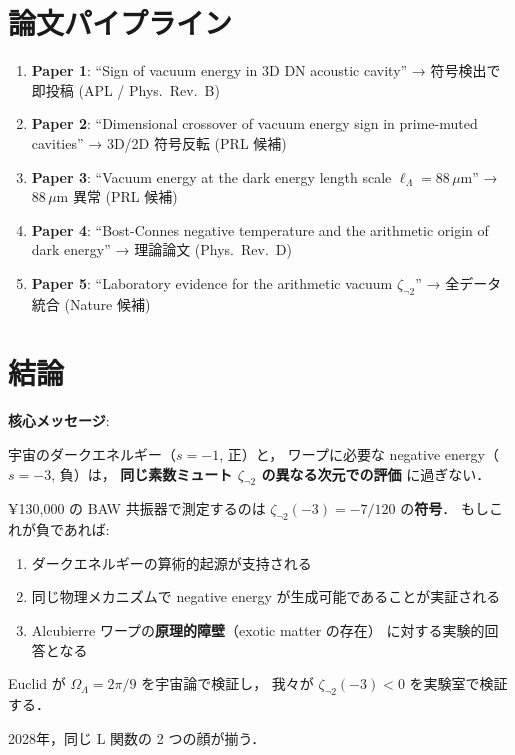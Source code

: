 \documentclass[11pt,a4paper]{article}
\begin{document}
\section{論文パイプライン}

\begin{enumerate}
\item \textbf{Paper 1}: ``Sign of vacuum energy in 3D DN acoustic cavity''
  → 符号検出で即投稿 (APL / Phys.\ Rev.\ B)

\item \textbf{Paper 2}: ``Dimensional crossover of vacuum energy sign
  in prime-muted cavities''
  → 3D/2D 符号反転 (PRL 候補)

\item \textbf{Paper 3}: ``Vacuum energy at the dark energy length scale
  $\ell_\Lambda = 88\,\mu$m''
  → 88\,$\mu$m 異常 (PRL 候補)

\item \textbf{Paper 4}: ``Bost-Connes negative temperature and the
  arithmetic origin of dark energy''
  → 理論論文 (Phys.\ Rev.\ D)

\item \textbf{Paper 5}: ``Laboratory evidence for the arithmetic vacuum
  $\zeta_{\neg 2}$''
  → 全データ統合 (Nature 候補)
\end{enumerate}


\section{結論}

\begin{tcolorbox}[colback=green!5,colframe=green!60!black]
\textbf{核心メッセージ}:

宇宙のダークエネルギー（$s=-1$, 正）と，
ワープに必要な negative energy（$s=-3$, 負）は，
\textbf{同じ素数ミュート $\zeta_{\neg 2}$ の異なる次元での評価}
に過ぎない．

¥130,000 の BAW 共振器で測定するのは $\zeta_{\neg 2}(-3) = -7/120$
の\textbf{符号}．
もしこれが負であれば:
\begin{enumerate}
\item ダークエネルギーの算術的起源が支持される
\item 同じ物理メカニズムで negative energy が生成可能であることが実証される
\item Alcubierre ワープの\textbf{原理的障壁}（exotic matter の存在）
  に対する実験的回答となる
\end{enumerate}

Euclid が $\Omega_\Lambda = 2\pi/9$ を宇宙論で検証し，
我々が $\zeta_{\neg 2}(-3) < 0$ を実験室で検証する．

2028年，同じ L 関数の 2 つの顔が揃う．
\end{tcolorbox}
\end{document}
